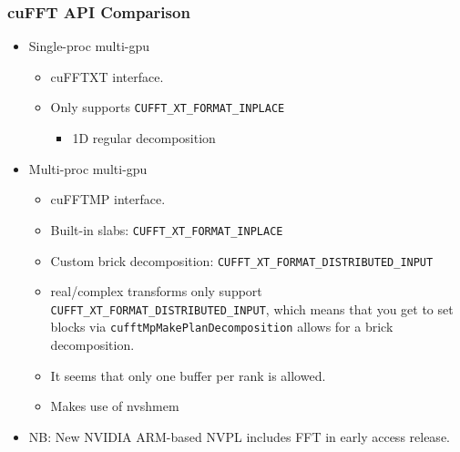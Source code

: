 \documentclass[10pt,aspectratio=169]{beamer}
\begin{document}
\begin{frame}
  \frametitle{cuFFT API Comparison}


  \begin{itemize}
  \item Single-proc multi-gpu
    \begin{itemize}
    \item cuFFTXT interface.
    \item Only supports \lstinline{CUFFT_XT_FORMAT_INPLACE}
      \begin{itemize}
      \item 1D regular decomposition
      \end{itemize}
    \end{itemize}
  \item Multi-proc multi-gpu
    \begin{itemize}
    \item cuFFTMP interface.
    \item Built-in slabs: \lstinline{CUFFT_XT_FORMAT_INPLACE}
    \item Custom brick decomposition: \lstinline{CUFFT_XT_FORMAT_DISTRIBUTED_INPUT}
    \item real/complex transforms only support
      \lstinline{CUFFT_XT_FORMAT_DISTRIBUTED_INPUT}, which means that
      you get to set blocks via
      \lstinline{cufftMpMakePlanDecomposition} allows for a brick
      decomposition.
    \item It seems that only one buffer per rank is allowed.
    \item Makes use of nvshmem
    \end{itemize}
    \item NB: New NVIDIA ARM-based NVPL includes FFT in early access release.
  \end{itemize}

  
\end{frame}
\end{document}
